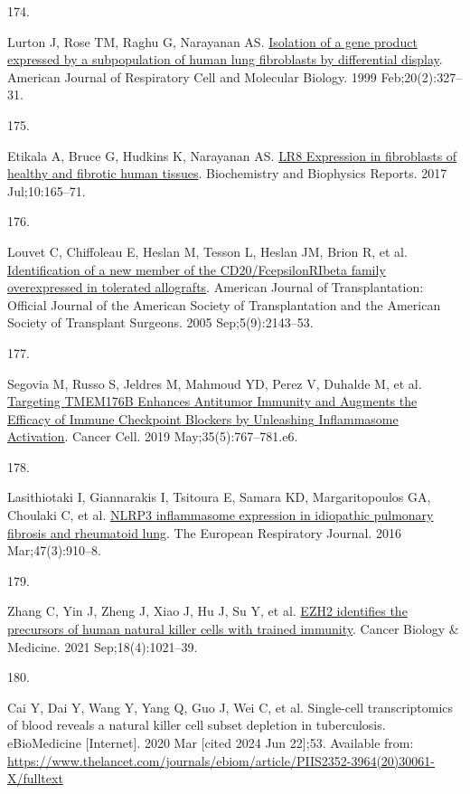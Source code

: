 \documentclass[
]{article}
\newlength{\cslhangindent}
\newlength{\csllabelwidth}
\newenvironment{CSLReferences}[2] %
 {\begin{list}{}{%
  \setlength{\itemindent}{0pt}
  \setlength{\leftmargin}{0pt}
  \setlength{\parsep}{0pt}
  \ifodd #1
   \setlength{\leftmargin}{\cslhangindent}
   \setlength{\itemindent}{-1\cslhangindent}
  \fi
  \setlength{\itemsep}{#2\baselineskip}}}
 {\end{list}}
\newcommand{\CSLLeftMargin}[1]{\parbox[t]{\csllabelwidth}{\strut#1\strut}}
\newcommand{\CSLRightInline}[1]{\parbox[t]{\linewidth - \csllabelwidth}{\strut#1\strut}}
\begin{document}
\begin{CSLReferences}{0}{1}
\CSLLeftMargin{174. }%
\CSLRightInline{Lurton J, Rose TM, Raghu G, Narayanan AS. \href{https://doi.org/10.1165/ajrcmb.20.2.3368}{Isolation of a gene product expressed by a subpopulation of human lung fibroblasts by differential display}. American Journal of Respiratory Cell and Molecular Biology. 1999 Feb;20(2):327--31. }

\CSLLeftMargin{175. }%
\CSLRightInline{Etikala A, Bruce G, Hudkins K, Narayanan AS. \href{https://doi.org/10.1016/j.bbrep.2017.03.012}{{LR8} {Expression} in fibroblasts of healthy and fibrotic human tissues}. Biochemistry and Biophysics Reports. 2017 Jul;10:165--71. }

\CSLLeftMargin{176. }%
\CSLRightInline{Louvet C, Chiffoleau E, Heslan M, Tesson L, Heslan JM, Brion R, et al. \href{https://doi.org/10.1111/j.1600-6143.2005.01007.x}{Identification of a new member of the {CD20}/{FcepsilonRIbeta} family overexpressed in tolerated allografts}. American Journal of Transplantation: Official Journal of the American Society of Transplantation and the American Society of Transplant Surgeons. 2005 Sep;5(9):2143--53. }

\CSLLeftMargin{177. }%
\CSLRightInline{Segovia M, Russo S, Jeldres M, Mahmoud YD, Perez V, Duhalde M, et al. \href{https://doi.org/10.1016/j.ccell.2019.04.003}{Targeting {TMEM176B} {Enhances} {Antitumor} {Immunity} and {Augments} the {Efficacy} of {Immune} {Checkpoint} {Blockers} by {Unleashing} {Inflammasome} {Activation}}. Cancer Cell. 2019 May;35(5):767--781.e6. }

\CSLLeftMargin{178. }%
\CSLRightInline{Lasithiotaki I, Giannarakis I, Tsitoura E, Samara KD, Margaritopoulos GA, Choulaki C, et al. \href{https://doi.org/10.1183/13993003.00564-2015}{{NLRP3} inflammasome expression in idiopathic pulmonary fibrosis and rheumatoid lung}. The European Respiratory Journal. 2016 Mar;47(3):910--8. }

\CSLLeftMargin{179. }%
\CSLRightInline{Zhang C, Yin J, Zheng J, Xiao J, Hu J, Su Y, et al. \href{https://doi.org/10.20892/j.issn.2095-3941.2020.0791}{{EZH2} identifies the precursors of human natural killer cells with trained immunity}. Cancer Biology \& Medicine. 2021 Sep;18(4):1021--39. }

\CSLLeftMargin{180. }%
\CSLRightInline{Cai Y, Dai Y, Wang Y, Yang Q, Guo J, Wei C, et al. Single-cell transcriptomics of blood reveals a natural killer cell subset depletion in tuberculosis. eBioMedicine {[}Internet{]}. 2020 Mar {[}cited 2024 Jun 22{]};53. Available from: \url{https://www.thelancet.com/journals/ebiom/article/PIIS2352-3964(20)30061-X/fulltext}}


\end{CSLReferences}
\end{document}
